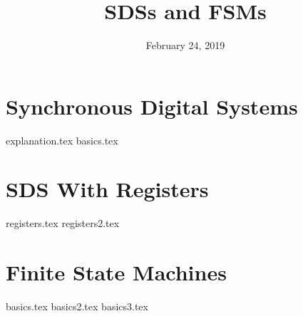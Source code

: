 \documentclass[11pt]{exam}
\title{SDSs and FSMs}
\date{February 24, 2019}
\begin{document}
\maketitle

\section{Synchronous Digital Systems}
\begin{questions}
{explanation.tex}
{basics.tex}
\end{questions}
\newpage

\section{SDS With Registers}
\begin{questions}
{registers.tex}
{registers2.tex}
\end{questions}
\newpage

\section{Finite State Machines}
\begin{questions}
{basics.tex}
{basics2.tex}
{basics3.tex}
\end{questions}
\end{document}
